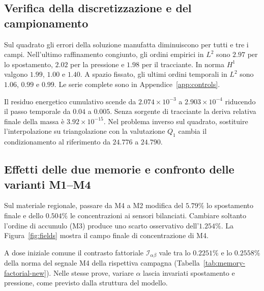 \subsection{Verifica della discretizzazione e del campionamento}
\label{sec:results-mms}

Sul quadrato gli errori della soluzione manufatta diminuiscono per tutti e tre i campi. Nell'ultimo raffinamento congiunto, gli ordini empirici in $L^2$ sono $2.97$ per lo spostamento, $2.02$ per la pressione e $1.98$ per il tracciante. In norma $H^1$ valgono $1.99$, $1.00$ e $1.40$. A spazio fissato, gli ultimi ordini temporali in $L^2$ sono $1.06$, $0.99$ e $0.99$. Le serie complete sono in Appendice~\ref{app:controls}.

Il residuo energetico cumulativo scende da $2.074\times10^{-3}$ a $2.903\times10^{-4}$ riducendo il passo temporale da $0.04$ a $0.005$. Senza sorgente di tracciante la deriva relativa finale della massa è $3.92\times10^{-15}$. Nel problema inverso sul quadrato, sostituire l'interpolazione su triangolazione con la valutazione $Q_1$ cambia il condizionamento al riferimento da $24.776$ a $24.790$.

\subsection{Effetti delle due memorie e confronto delle varianti M1--M4}
\label{sec:results-memory-variants}

Sul materiale regionale, passare da M4 a M2 modifica del $5.79\%$ lo spostamento finale e dello $0.504\%$ le concentrazioni ai sensori bilanciati. Cambiare soltanto l'ordine di accumulo (M3) produce uno scarto osservativo dell'$1.254\%$. La Figura~\ref{fig:fields} mostra il campo finale di concentrazione di M4.

A dose iniziale comune il contrasto fattoriale $\mathcal I_{\alpha\beta}$ vale tra lo $0.2251\%$ e lo $0.2558\%$ della norma del segnale M4 della rispettiva campagna (Tabella~\ref{tab:memory-factorial-new}). Nelle stesse prove, variare $\alpha$ lascia invariati spostamento e pressione, come previsto dalla struttura del modello.

